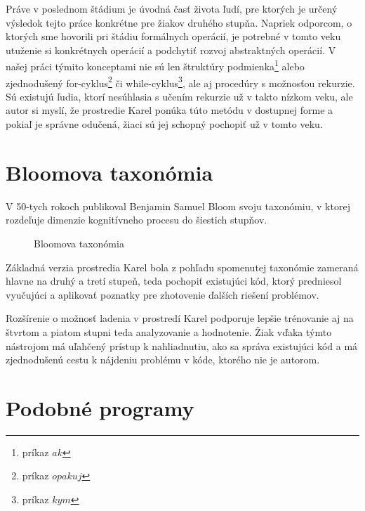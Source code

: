 Práve v poslednom štádium je úvodná časť života ľudí, pre ktorých je určený výsledok tejto práce konkrétne pre žiakov druhého stupňa. 
Napriek odporcom, o ktorých sme hovorili pri štádiu formálnych operácií, je potrebné v tomto veku utuženie si konkrétnych operácií a podchytiť rozvoj abstraktných operácií.
V našej práci týmito konceptami nie sú len štruktúry podmienka\footnote{príkaz $ak$} alebo zjednodušený for-cyklus\footnote{príkaz $opakuj$} či while-cyklus\footnote{príkaz $kym$}, ale aj procedúry s možnosťou rekurzie.
Sú existujú ľudia, ktorí nesúhlasia s učením rekurzie už v takto nízkom veku, ale autor si myslí, že prostredie Karel ponúka túto metódu v dostupnej forme a pokiaľ je správne odučená, žiaci sú jej schopný pochopiť už v tomto veku.


\section{Bloomova taxonómia}  \label{bloom}

V 50-tych rokoch publikoval Benjamin Samuel Bloom svoju taxonómiu, v ktorej rozdeľuje dimenzie kognitívneho procesu do šiestich stupňov. 

\begin{figure}[ht]
\centering
{}
\caption{Bloomova taxonómia}
\end{figure}

Základná verzia prostredia Karel bola z pohľadu spomenutej taxonómie zameraná hlavne na druhý a tretí stupeň, teda pochopiť existujúci kód, ktorý predniesol vyučujúci a aplikovať poznatky pre zhotovenie ďalších riešení problémov.

Rozšírenie o možnosť ladenia v prostredí Karel podporuje lepšie trénovanie aj na štvrtom a piatom stupni teda analyzovanie a hodnotenie.
Žiak vďaka týmto nástrojom má uľahčený prístup k nahliadnutiu, ako sa správa existujúci kód a má zjednodušenú cestu k nájdeniu problému v kóde, ktorého nie je autorom.

\section{Podobné programy}  \label{podobne}



